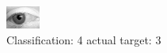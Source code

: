 \begin{figure}[h!]
\begin{center}
\includegraphics[width=0.60\columnwidth]{figures/ID2844_class_4_target_3.png}
\end{center}
\caption{ Classification: 4 actual target: 3}
\label{fig:ID2844_class_4_target_3}
\end{figure}
